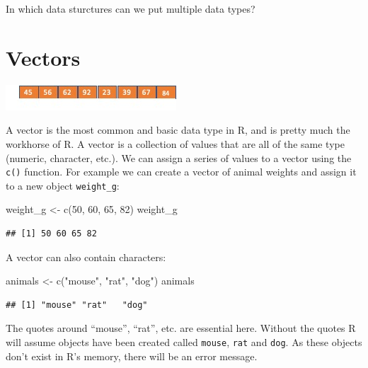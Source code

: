 \documentclass[
]{book}
\newenvironment{Shaded}{\begin{snugshade}}{\end{snugshade}}
\newcommand{\DecValTok}[1]{\textcolor[rgb]{0.00,0.00,0.81}{#1}}
\newcommand{\FunctionTok}[1]{\textcolor[rgb]{0.00,0.00,0.00}{#1}}
\newcommand{\NormalTok}[1]{#1}
\newcommand{\OtherTok}[1]{\textcolor[rgb]{0.56,0.35,0.01}{#1}}
\newcommand{\StringTok}[1]{\textcolor[rgb]{0.31,0.60,0.02}{#1}}
\begin{document}
In which data sturctures can we put multiple data types?

\hypertarget{vectors}{%
\section{Vectors}\label{vectors}}

\includegraphics{vec1.jpg}

A vector is the most common and basic data type in R, and is pretty much the workhorse of R. A vector is a collection of values that are all of the same type (numeric, character, etc.). We can assign a series of values to a vector using the \texttt{c()} function. For example we can create a vector of animal weights and assign it to a new object \texttt{weight\_g}:

\begin{Shaded}
\begin{Highlighting}[]
\NormalTok{weight\_g }\OtherTok{\textless{}{-}} \FunctionTok{c}\NormalTok{(}\DecValTok{50}\NormalTok{, }\DecValTok{60}\NormalTok{, }\DecValTok{65}\NormalTok{, }\DecValTok{82}\NormalTok{)}
\NormalTok{weight\_g}
\end{Highlighting}
\end{Shaded}

\begin{verbatim}
## [1] 50 60 65 82
\end{verbatim}

A vector can also contain characters:

\begin{Shaded}
\begin{Highlighting}[]
\NormalTok{animals }\OtherTok{\textless{}{-}} \FunctionTok{c}\NormalTok{(}\StringTok{"mouse"}\NormalTok{, }\StringTok{"rat"}\NormalTok{, }\StringTok{"dog"}\NormalTok{)}
\NormalTok{animals}
\end{Highlighting}
\end{Shaded}

\begin{verbatim}
## [1] "mouse" "rat"   "dog"
\end{verbatim}

The quotes around ``mouse'', ``rat'', etc. are essential here. Without the quotes R will assume objects have been created called \texttt{mouse}, \texttt{rat} and \texttt{dog}. As these objects don't exist in R's memory, there will be an error message.
\end{document}
